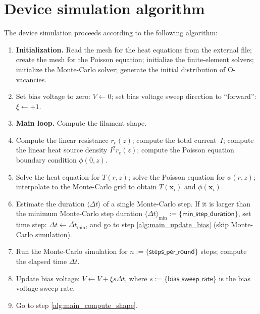 \documentclass[10pt]{article}
\renewcommand{\vec}[1]{\mathbf{#1}}
\newcommand{\vx}{\vec{x}}
\begin{document}
\section{Device simulation algorithm}

The device simulation proceeds according to the following algorithm:

\begin{enumerate}
	\item \textbf{Initialization.} Read the mesh for the heat equations from the
	      external file; create the mesh for the Poisson equation; initialize the
	      finite-element solvers; initialize the Monte-Carlo solver; generate the
	      initial distribution of O-vacancies.

	\item Set bias voltage to zero: $V \gets 0$; set bias voltage sweep direction
	      to ``forward'': $\xi \gets +1$.

	\item \label{alg:main_compute_shape} \textbf{Main loop.} Compute the filament
	      shape.

	\item Compute the linear resistance $r_c(z)$; compute
	      the total current~$I$; compute the linear heat source density $I^2 r_c(z)$;
	      compute the Poisson equation boundary condition $\phi(0, z)$.

	\item Solve the heat equation for $T(r, z)$; solve the Poisson equation for
	      $\phi(r, z)$; interpolate to the Monte-Carlo grid to obtain $T(\vx_i)$
	      and $\phi(\vx_i)$.

	\item Estimate the duration $\langle \Delta t \rangle$ of a single Monte-Carlo
	      step. If it is larger than the minimum Monte-Carlo step duration
	      $\langle \Delta t \rangle_{\min} := \{ \mathsf{min\_step\_duration} \}$,
	      set time step: $\Delta t \gets \overline{\Delta t}_{\min}$, and go to
	      step \ref{alg:main_update_bias} (skip Monte-Carlo simulation).

	\item Run the Monte-Carlo simulation for $n := \{ \mathsf{steps\_per\_round} \}$
	      steps; compute the elapsed time $\Delta t$.

	\item \label{alg:main_update_bias} Update bias voltage:
	      $V \gets V + \xi s \Delta t$, where $s := \{ \mathsf{bias\_sweep\_rate} \}$
	      is the bias voltage sweep rate.

	\item Go to step \ref{alg:main_compute_shape}.
\end{enumerate}
\end{document}
